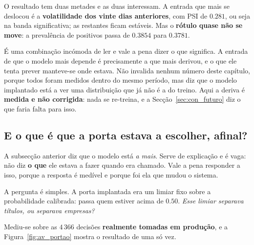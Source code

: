 O resultado tem duas metades e as duas interessam. A entrada que mais se deslocou é a
\textbf{volatilidade dos vinte dias anteriores}, com \gls{PSI} de $0.281$, ou seja na banda
significativa; as restantes ficam estáveis. Mas o \textbf{rótulo quase não se move}: a prevalência
de positivos passa de $0.3854$ para $0.3781$.

É uma combinação incómoda de ler e vale a pena dizer o que significa. A entrada de que o modelo mais
depende é precisamente a que mais derivou, e o que ele tenta prever manteve-se onde estava. Não
invalida nenhum número deste capítulo, porque todos foram medidos dentro do mesmo período, mas
diz que o modelo implantado está a ver uma distribuição que já não é a do treino. Aqui a deriva é
\textbf{medida e não corrigida}: nada se re-treina, e a Secção~\ref{sec:con_futuro} diz o que
faria falta para isso.

\subsection{E o que é que a porta estava a escolher, afinal?}
\label{sec:av_portao}

A subsecção anterior diz que o modelo está \emph{a mais}. Serve de explicação e é vaga: não
diz \textbf{o que} ele estava a fazer quando era chamado. Vale a pena responder a isso, porque a
resposta é medível e porque foi ela que mudou o sistema.

A pergunta é simples. A porta implantada era um limiar fixo sobre a probabilidade calibrada: passa
quem estiver acima de $0.50$. \emph{Esse limiar separava títulos, ou separava empresas?}

Mediu-se sobre as $4\,366$ decisões \textbf{realmente tomadas em produção}, e a
Figura~\ref{fig:av_portao} mostra o resultado de uma só vez.

